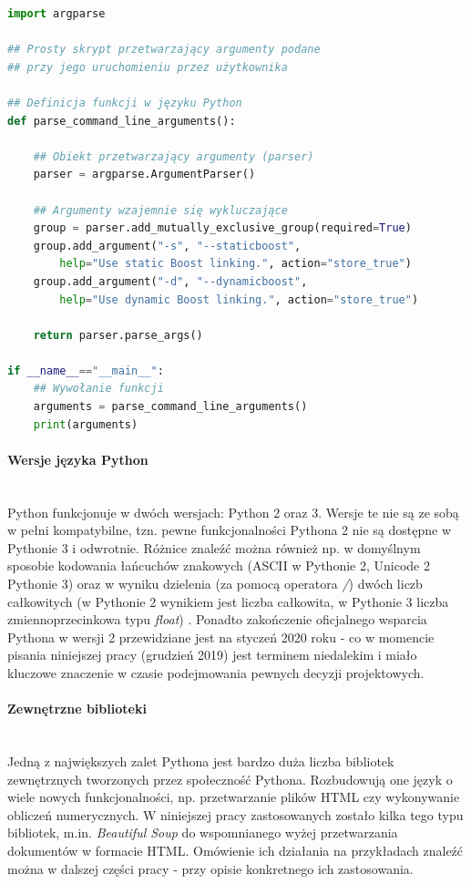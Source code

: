 \begin{lstlisting}[language=python,caption={Przykład prostego skryptu napisanego w języku Python 3 - przetwarzanie argumentów podanych przez użytkownika do skryptu}, label={lst:pyexample}]
import argparse

## Prosty skrypt przetwarzający argumenty podane 
## przy jego uruchomieniu przez użytkownika

## Definicja funkcji w języku Python
def parse_command_line_arguments():

    ## Obiekt przetwarzający argumenty (parser)
    parser = argparse.ArgumentParser()

    ## Argumenty wzajemnie się wykluczające
    group = parser.add_mutually_exclusive_group(required=True)
    group.add_argument("-s", "--staticboost", 
        help="Use static Boost linking.", action="store_true")
    group.add_argument("-d", "--dynamicboost",
        help="Use dynamic Boost linking.", action="store_true")

    return parser.parse_args()

if __name__=="__main__":
    ## Wywołanie funkcji
    arguments = parse_command_line_arguments()
    print(arguments)


\end{lstlisting}

\paragraph*{Wersje języka Python}\mbox{} \\
Python funkcjonuje w dwóch wersjach: Python 2 oraz 3. Wersje te nie są ze sobą w pełni kompatybilne, tzn. pewne funkcjonalności Pythona 2 nie są dostępne w Pythonie 3 i odwrotnie. Różnice znaleźć można również np. w domyślnym sposobie kodowania łańcuchów znakowych (ASCII w Pythonie 2, Unicode 2 Pythonie 3) oraz w wyniku dzielenia (za pomocą operatora \textit{/}) dwóch liczb całkowitych (w Pythonie 2 wynikiem jest liczba całkowita, w Pythonie 3 liczba zmiennoprzecinkowa typu \textit{float}) \cite{Python2vs3}. Ponadto zakończenie oficjalnego wsparcia Pythona w wersji 2 przewidziane jest na styczeń 2020 roku \cite{Python2Countdown} - co w momencie pisania niniejszej pracy (grudzień 2019) jest terminem niedalekim i miało kluczowe znaczenie w czasie podejmowania pewnych decyzji projektowych.

\paragraph*{Zewnętrzne biblioteki}\mbox{} \\
Jedną z największych zalet Pythona jest bardzo duża liczba bibliotek zewnętrznych tworzonych przez społeczność Pythona. Rozbudowują one język o wiele nowych funkcjonalności, np. przetwarzanie plików HTML czy wykonywanie obliczeń numerycznych. W niniejszej pracy zastosowanych zostało kilka tego typu bibliotek, m.in. \textit{Beautiful Soup} do wspomnianego wyżej przetwarzania dokumentów w formacie HTML. Omówienie ich działania na przykładach znaleźć można w dalszej części pracy - przy opisie konkretnego ich zastosowania. 


